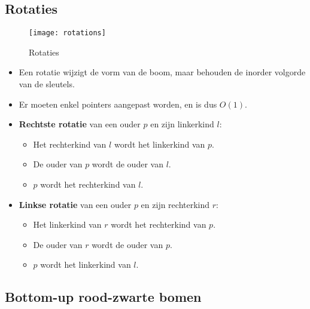 \subsection{Rotaties}
\begin{figure}[ht]
    \centering
    \texttt{[image: rotations]}
    \caption{Rotaties}
    \label{fig:rotations}
\end{figure}
\begin{itemize}
    \item Een rotatie wijzigt de vorm van de boom, maar behouden de inorder volgorde van de sleutels.
    \item Er moeten enkel pointers aangepast worden, en is dus $O(1)$.
    \item \textbf{Rechtste rotatie} van een ouder $p$ en zijn linkerkind $l$:
    \begin{itemize}
        \item Het rechterkind van $l$ wordt het linkerkind van $p$.
        \item De ouder van $p$ wordt de ouder van $l$.
        \item $p$ wordt het rechterkind van $l$. 
    \end{itemize}
    \item \textbf{Linkse rotatie} van een ouder $p$ en zijn rechterkind $r$:
    \begin{itemize}
        \item Het linkerkind van $r$ wordt het rechterkind van $p$.
        \item De ouder van $r$ wordt de ouder van $p$.
        \item $p$ wordt het linkerkind van $l$. 
    \end{itemize}
\end{itemize}

\subsection{Bottom-up rood-zwarte bomen}
